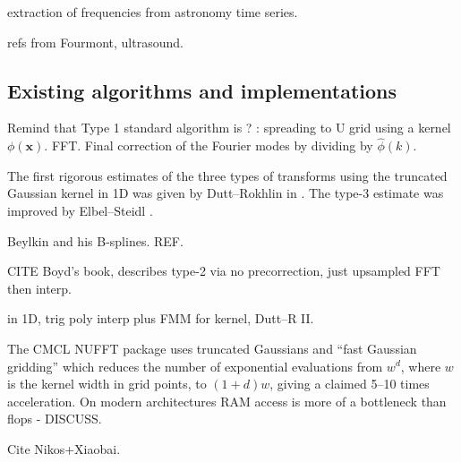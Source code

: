 \documentclass[10pt]{article}
\newcommand{\mbf}[1]{{\mathbf #1}}
\newcommand{\xx}{\mbf{x}}
\begin{document}
extraction of frequencies from astronomy time series.

refs from Fourmont, ultrasound.



\subsection{Existing algorithms and implementations}

Remind that Type 1 standard algorithm is ? :
spreading to U grid using a kernel $\phi(\xx)$.
FFT.
Final correction of the Fourier modes by dividing by
$\hat\phi(k)$.

The first rigorous estimates of the three types of transforms
using the truncated Gaussian kernel in 1D was given by
Dutt--Rokhlin in \cite{dutt}.
The type-3 estimate was improved by Elbel--Steidl \cite{elbel}.


Beylkin and his B-splines. REF.

CITE Boyd's book, describes type-2 via no precorrection, just upsampled FFT
then interp.

in 1D, trig poly interp plus FMM for kernel, Dutt--R II.

The CMCL NUFFT package \cite{cmcl} uses truncated Gaussians
and ``fast Gaussian gridding'' \cite[Sec.~3]{nufft}
which reduces the number of exponential evaluations
from $w^d$, where $w$ is the kernel width in grid points,
to $(1+d)w$, giving a claimed 5--10 times acceleration.
On modern architectures RAM access is more of a bottleneck than
flops - DISCUSS.

Cite Nikos+Xiaobai.
\end{document}
